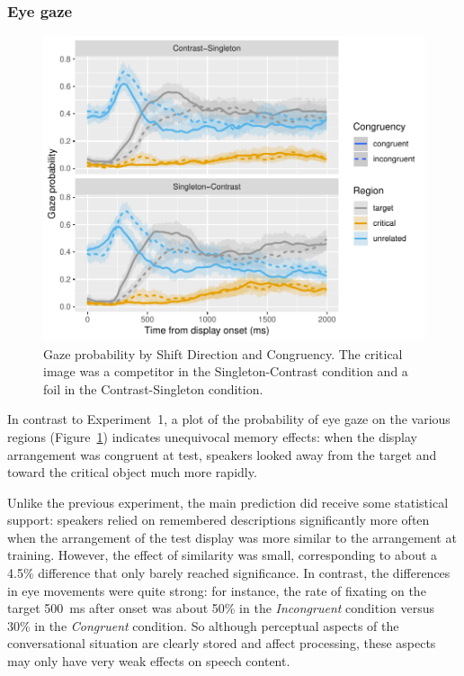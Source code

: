 \documentclass[natbib,doc,a4paper]{apa6}
\begin{document}
\subsubsection*{Eye gaze}
\label{sec:org4b26e98}

\begin{figure}[htbp]
\centering
\includegraphics[width=.9\linewidth]{exp2/img/exp2-probplot.pdf}
\caption{\label{fig:orgab58edd}
Gaze probability by Shift Direction and Congruency. The critical image was a competitor in the Singleton-Contrast condition and a foil in the Contrast-Singleton condition.}
\end{figure}

In contrast to Experiment~1, a plot of the probability of eye gaze on the various regions (Figure~\ref{fig:orgab58edd}) indicates unequivocal memory effects: when the display arrangement was congruent at test, speakers looked away from the target and toward the critical object much more rapidly.

Unlike the previous experiment, the main prediction did receive some statistical support: speakers relied on remembered descriptions significantly more often when the arrangement of the test display was more similar to the arrangement at training.  However, the effect of similarity was small, corresponding to about a 
4.5\%
difference that only barely reached significance. In contrast, the differences in eye movements were quite strong: for instance, the rate of fixating on the target 500~ms after onset was about 50\% in the \emph{Incongruent} condition versus 30\% in the \emph{Congruent} condition. So although perceptual aspects of the conversational situation are clearly stored and affect processing, these aspects may only have very weak effects on speech content.
\end{document}
